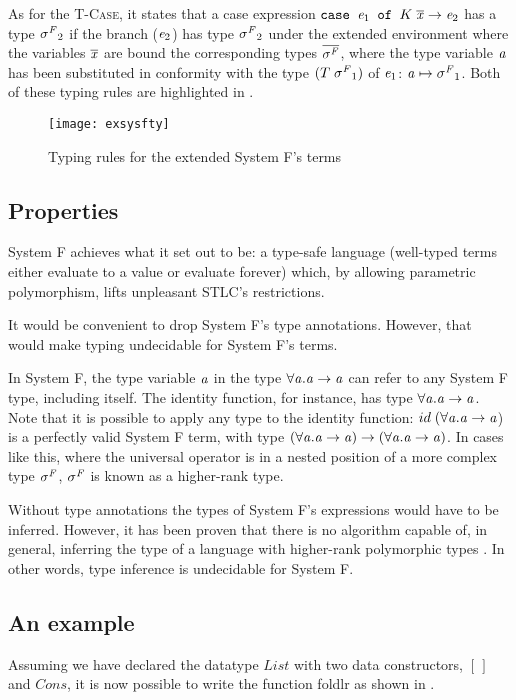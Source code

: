 As for the \textsc{T-Case}, it states that a case expression $\mathit{\texttt{case }} \mathit{e}_1 \mathit{\texttt{ of }} K \; \overline{\mathit{x}} \rightarrow \mathit{e}_2$ has a type $\mathit{\sigma^F}_2$ if the branch ($\mathit{e}_2$) has type $\mathit{\sigma^F}_2$ under the extended environment where the variables $\overline{\mathit{x}}$ are bound the corresponding types $\overline{\mathit{\sigma^F}}$, where the type variable $\mathit{a}$ has been substituted in conformity with the type $(T\;\mathit{\sigma^F}_1)$ of $\mathit{e}_1$: $\mathit{a} \mapsto \mathit{\sigma^F}_1$. Both of these typing rules are highlighted in .

\begin{figure}
  \texttt{[image: exsysfty]}
    \caption{Typing rules for the extended System F's terms}
  \label{exsysftytm}
\end{figure}

\subsection{Properties}
System F achieves what it set out to be: a type-safe language (well-typed terms either evaluate to a value or evaluate forever) which, by allowing parametric polymorphism, lifts unpleasant STLC's restrictions.

It would be convenient to drop System F's type annotations. However, that would make typing undecidable for System F's terms.

In System F, the type variable $\mathit{a}$ in the type $\forall {\mathit{a}} . {\mathit{a} \rightarrow \mathit{a}}$ can refer to any System F type, including itself. The identity function, for instance, has type $\forall {\mathit{a}} . {\mathit{a} \rightarrow \mathit{a}}$. Note that it is possible to apply any type to the identity function: $id\;(\forall {\mathit{a}} . {\mathit{a} \rightarrow \mathit{a}}$) is a perfectly valid System F term, with type $(\forall {\mathit{a}} . {\mathit{a} \rightarrow \mathit{a}}) \rightarrow (\forall {\mathit{a}} . {\mathit{a} \rightarrow \mathit{a}})$. In cases like this, where the universal operator is in a nested position of a more complex type $\mathit{\sigma^F}$, $\mathit{\sigma^F}$ is known as a higher-rank type.

Without type annotations the types of System F's expressions would have to be inferred. However, it has been proven that there is no algorithm capable of, in general, inferring the type of a language with higher-rank polymorphic types \cite{jones}. In other words, type inference is undecidable for System F.

\subsection{An example}
Assuming we have declared the datatype $List$ with two data constructors, $[\,]$ and $Cons$, it is now possible to write the function foldlr as shown in .

